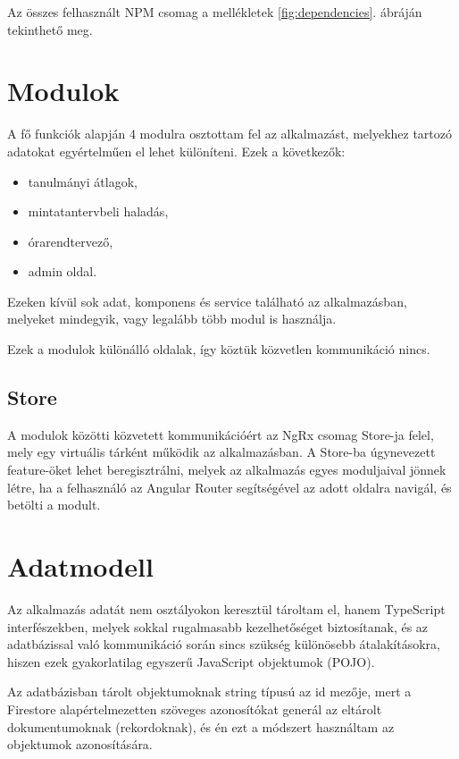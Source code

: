 \documentclass[a4paper,12pt]{report}
\begin{document}
Az összes felhasznált NPM csomag a mellékletek \ref{fig:dependencies}. ábráján tekinthető meg.

\section{Modulok}

A fő funkciók alapján 4 modulra osztottam fel az alkalmazást, melyekhez tartozó adatokat egyértelműen el lehet különíteni. Ezek a következők:
\begin{itemize}
    \item tanulmányi átlagok,
    \item mintatantervbeli haladás,
    \item órarendtervező,
    \item admin oldal.
\end{itemize}
Ezeken kívül sok adat, komponens és service található az alkalmazásban, melyeket mindegyik, vagy legalább több modul is használja.

Ezek a modulok különálló oldalak, így köztük közvetlen kommunikáció nincs.

\subsection{Store}

A modulok közötti közvetett kommunikációért az NgRx csomag Store-ja felel, mely egy virtuális tárként működik az alkalmazásban. A Store-ba úgynevezett feature-öket lehet beregisztrálni, melyek az alkalmazás egyes moduljaival jönnek létre, ha a felhasználó az Angular Router segítségével az adott oldalra navigál, és betölti a modult.

\section{Adatmodell}

Az alkalmazás adatát nem osztályokon keresztül tároltam el, hanem TypeScript interfészekben, melyek sokkal rugalmasabb kezelhetőséget biztosítanak, és az adatbázissal való kommunikáció során sincs szükség különösebb átalakításokra, hiszen ezek gyakorlatilag egyszerű JavaScript objektumok (POJO).

Az adatbázisban tárolt objektumoknak string típusú az id mezője, mert a Firestore alapértelmezetten szöveges azonosítókat generál az eltárolt dokumentumoknak (rekordoknak), és én ezt a módszert használtam az objektumok azonosítására.
\end{document}
